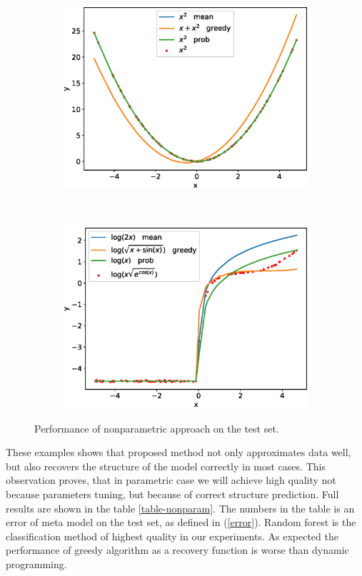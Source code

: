 \documentclass[12pt]{article}
\begin{document}
\begin{figure}[!ht]
\\
\begin{subfigure}{0.48\textwidth}
\includegraphics[width=\textwidth]{_non_param_3.eps}
\caption{}
\label{fig::_non_param_3}
\end{subfigure}
~
\begin{subfigure}{0.48\textwidth}
\includegraphics[width=\textwidth]{_non_param_4.eps}
\caption{}
\label{fig::_non_param_4}
\end{subfigure}
\caption{Performance of nonparametric approach on the test set.}
\label{fig::nonparametric}
\end{figure}

These examples shows that proposed method not only approximates data well, but also recovers the structure of the model correctly in most cases.
This observation proves, that in parametric case we will achieve high quality not because parameters tuning, but because of correct structure prediction.
Full results are shown in the table \ref{table-nonparam}.
The numbers in the table is an error of meta model on the test set, as defined in (\ref{error}).
Random forest is the classification method of highest quality in our experiments.
As expected the performance of greedy algorithm as a recovery function is worse than dynamic programming.
\end{document}
